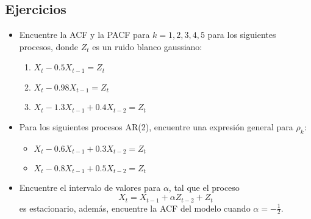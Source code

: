 \documentclass[10pt,a4paper]{article}
\begin{document}
\subsection{Ejercicios}
\begin{itemize}
	\item Encuentre la ACF y la PACF para $k = 1,2,3,4,5$ para los siguientes procesos, donde $Z_t$ es un ruido blanco gaussiano:
	\begin{enumerate}
		\item $X_t - 0.5 X_{t-1} = Z_t$
		\item $X_t - 0.98 X_{t-1} = Z_t$
		\item $X_t - 1.3 X_{t-1} + 0.4 X_{t-2} = Z_t$				
	\end{enumerate}
	\item Para los siguientes procesos AR(2), encuentre una expresión general para $\rho_k$:
	\begin{itemize}
		\item $X_t - 0.6 X_{t-1} + 0.3 X_{t-2} = Z_t$	
		\item $X_t - 0.8 X_{t-1} + 0.5 X_{t-2} = Z_t$	
	\end{itemize}
\item  Encuentre el intervalo de valores para $\alpha$, tal que el proceso
\begin{equation}
	X_t = X_{t-1}+\alpha Z_{t-2} + Z_t
\end{equation}
es estacionario, además, encuentre la ACF del modelo cuando $\alpha = - \frac{1}{2}$.
\end{itemize}
	
\end{document}
